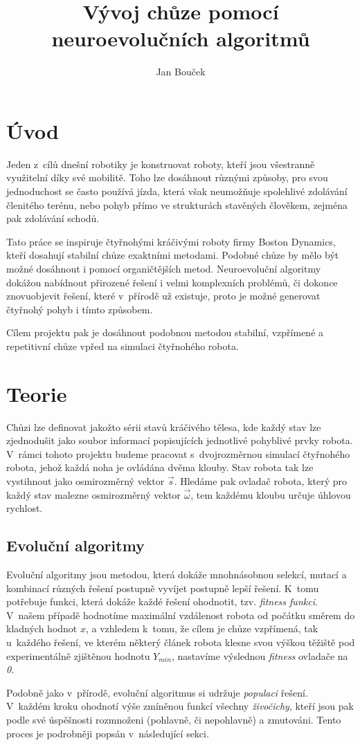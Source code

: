\documentclass[a4]{article}
\begin{document}
\title{Vývoj chůze pomocí neuroevolučních algoritmů} 
\author{Jan Bouček} 
\date{} 
\maketitle 
 
\section{Úvod} 
Jeden z~cílů dnešní robotiky je konstruovat roboty, kteří jsou všestranně využitelní díky své mobilitě. Toho lze dosáhnout různými způsoby, pro svou jednoduchost se často používá jízda, která však neumožňuje spolehlivé zdolávání členitého terénu, nebo pohyb přímo ve strukturách stavěných člověkem, zejména pak zdolávání schodů.\par
Tato práce se inspiruje čtyřnohými kráčivými roboty firmy Boston Dynamics\cite{bostondynamics}, kteří dosahují stabilní chůze exaktními metodami.\cite{bdpaper} Podobné chůze by mělo být možné dosáhnout i pomocí organičtějších metod. Neuroevoluční algoritmy dokážou nabídnout přirozené řešení i velmi komplexních problémů, či dokonce znovuobjevit řešení, které v~přírodě už existuje, proto je možné generovat čtyřnohý pohyb i tímto způsobem.\cite{clunegait}\par
Cílem projektu pak je dosáhnout podobnou metodou stabilní, vzpřímené a repetitivní chůze vpřed na simulaci čtyřnohého robota.
 
\section{Teorie}
Chůzi lze definovat jakožto sérii stavů kráčivého tělesa, kde každý stav lze zjednodušit jako soubor informací popisujících jednotlivé pohyblivé prvky robota. V~rámci tohoto projektu budeme pracovat s~dvojrozměrnou simulací čtyřnohého robota, jehož každá noha je ovládána dvěma klouby. Stav robota tak lze vystihnout jako osmirozměrný vektor $\vec{s}$. Hledáme pak ovladač robota, který pro každý stav malezne osmirozměrný vektor $\vec{\omega}$, tem každému kloubu určuje úhlovou rychlost.
\subsection{Evoluční algoritmy}
Evoluční algoritmy jsou metodou, která dokáže mnohnásobnou selekcí, mutací a kombinací různých řešení postupně vyvíjet postupně lepší řešení. K~tomu potřebuje funkci, která dokáže každé řešení ohodnotit, tzv. \emph{fitness funkci}. V~našem případě hodnotíme maximální vzdálenost robota od počátku směrem do kladných hodnot $x$, a vzhledem k~tomu, že cílem je chůze vzpřímená, tak u~každého řešení, ve kterém některý článek robota klesne svou výškou těžiště pod experimentálně zjištěnou hodnotu $Y_{min}$, nastavíme výslednou \emph{fitness} ovladače na \emph{0}.\par
Podobně jako v~přírodě, evoluční algoritmus si udržuje \emph{populaci} řešení. V~každém kroku ohodnotí výše zmíněnou funkcí všechny \emph{živočichy}, kteří jsou pak podle své úspěšnosti rozmnoženi (pohlavně, či nepohlavně) a zmutováni. Tento proces je podrobněji popsán v~následující sekci.
\end{document}
